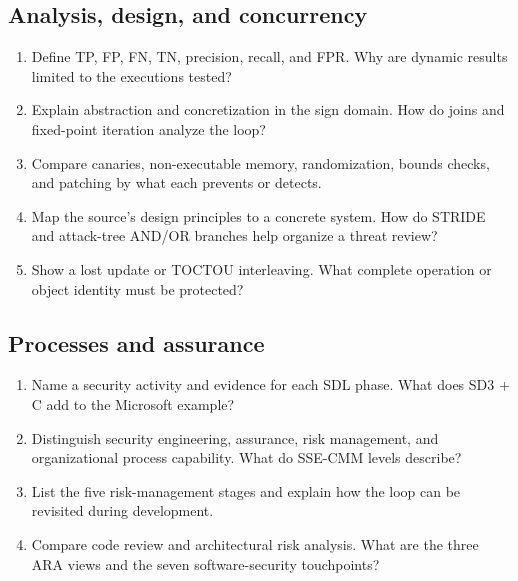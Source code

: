 \documentclass[11pt,a4paper]{article}
\numberwithin{figure}{section}
\begin{document}
\subsection{Analysis, design, and concurrency}
\begin{enumerate}[resume]
\item Define TP, FP, FN, TN, precision, recall, and FPR. Why are dynamic results limited to the executions tested?
\item Explain abstraction and concretization in the sign domain. How do joins and fixed-point iteration analyze the loop?
\item Compare canaries, non-executable memory, randomization, bounds checks, and patching by what each prevents or detects.
\item Map the source's design principles to a concrete system. How do STRIDE and attack-tree AND/OR branches help organize a threat review?
\item Show a lost update or TOCTOU interleaving. What complete operation or object identity must be protected?
\end{enumerate}

\subsection{Processes and assurance}
\begin{enumerate}[resume]
\item Name a security activity and evidence for each SDL phase. What does SD3 + C add to the Microsoft example?
\item Distinguish security engineering, assurance, risk management, and organizational process capability. What do SSE-CMM levels describe?
\item List the five risk-management stages and explain how the loop can be revisited during development.
\item Compare code review and architectural risk analysis. What are the three ARA views and the seven software-security touchpoints?
\end{enumerate}
\end{document}
